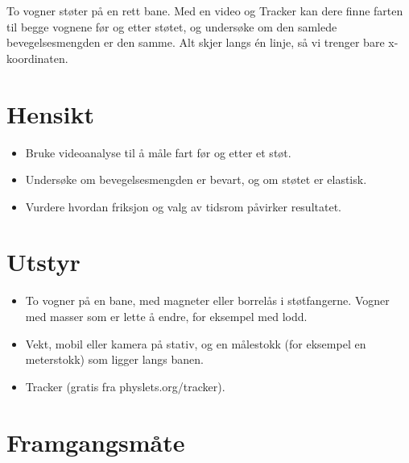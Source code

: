 \documentclass[11pt]{article}
\begin{document}

To vogner støter på en rett bane. Med en video og Tracker kan dere finne farten til begge vognene før og etter støtet, og undersøke om den samlede bevegelsesmengden er den samme. Alt skjer langs én linje, så vi trenger bare x-koordinaten.

\section*{Hensikt}

\begin{itemize}
\item Bruke videoanalyse til å måle fart før og etter et støt.
\item Undersøke om bevegelsesmengden er bevart, og om støtet er elastisk.
\item Vurdere hvordan friksjon og valg av tidsrom påvirker resultatet.
\end{itemize}

\section*{Utstyr}

\begin{itemize}
\item To vogner på en bane, med magneter eller borrelås i støtfangerne. Vogner med masser som er lette å endre, for eksempel med lodd.
\item Vekt, mobil eller kamera på stativ, og en målestokk (for eksempel en meterstokk) som ligger langs banen.
\item Tracker (gratis fra physlets.org/tracker).
\end{itemize}

\section*{Framgangsmåte}
\end{document}
